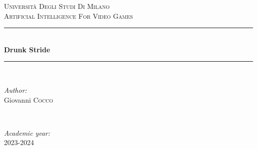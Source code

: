 \documentclass[12pt, a4paper]{article}
\begin{document}
\begin{titlepage}

    \newcommand{\HRule}{\rule{\linewidth}{0.5mm}} %
    
    \center %
     
    
    \textsc{\LARGE Università Degli Studi Di Milano}\\[1.5cm] %
    \textsc{\Large Artificial Intelligence For Video Games}\\[0.5cm] %
    
    
    \HRule \\[0.4cm]
    { \huge \bfseries Drunk Stride }\\[0.4cm] %
    \HRule \\[1.5cm]
     
    
    \begin{minipage}{0.4\textwidth}
    \begin{flushleft} \large
    \emph{Author:}\\
    Giovanni \textsc{Cocco} \\
    \end{flushleft}
    \end{minipage}
    ~
    \begin{minipage}{0.4\textwidth}
    \begin{flushright} \large
    \emph{Academic year:} \\
    2023-2024\\
    \end{flushright}
    \end{minipage}\\[2cm]
    

\end{titlepage}
\end{document}
